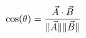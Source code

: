 \documentclass[preview]{standalone}
\begin{document}
\begin{align*}
\special{dvisvgm:raw <g id='unique000'>}\cos(\theta) = \frac{\vec{A} \cdot \vec{B}}{\|\vec{A}\| \|\vec{B}\|}\special{dvisvgm:raw </g>}
\end{align*}
\end{document}

